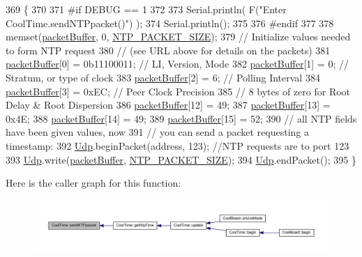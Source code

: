 \begin{DoxyCode}
369 \{
370 
371 \textcolor{preprocessor}{#if DEBUG == 1 }
372 
373     Serial.println( F(\textcolor{stringliteral}{"Enter CoolTime.sendNTPpacket()"}) );
374     Serial.println();
375 
376 \textcolor{preprocessor}{#endif}
377 
378     memset(\hyperlink{class_cool_time_a27e6abc82a5c2f72161956967005bec7}{packetBuffer}, 0, \hyperlink{_cool_time_8h_a56a6ea64006651b4f42adf713e244f06}{NTP\_PACKET\_SIZE});
379     \textcolor{comment}{// Initialize values needed to form NTP request}
380     \textcolor{comment}{// (see URL above for details on the packets)}
381     \hyperlink{class_cool_time_a27e6abc82a5c2f72161956967005bec7}{packetBuffer}[0] = 0b11100011;   \textcolor{comment}{// LI, Version, Mode}
382     \hyperlink{class_cool_time_a27e6abc82a5c2f72161956967005bec7}{packetBuffer}[1] = 0;     \textcolor{comment}{// Stratum, or type of clock}
383     \hyperlink{class_cool_time_a27e6abc82a5c2f72161956967005bec7}{packetBuffer}[2] = 6;     \textcolor{comment}{// Polling Interval}
384     \hyperlink{class_cool_time_a27e6abc82a5c2f72161956967005bec7}{packetBuffer}[3] = 0xEC;  \textcolor{comment}{// Peer Clock Precision}
385     \textcolor{comment}{// 8 bytes of zero for Root Delay & Root Dispersion}
386     \hyperlink{class_cool_time_a27e6abc82a5c2f72161956967005bec7}{packetBuffer}[12]  = 49;
387     \hyperlink{class_cool_time_a27e6abc82a5c2f72161956967005bec7}{packetBuffer}[13]  = 0x4E;
388     \hyperlink{class_cool_time_a27e6abc82a5c2f72161956967005bec7}{packetBuffer}[14]  = 49;
389     \hyperlink{class_cool_time_a27e6abc82a5c2f72161956967005bec7}{packetBuffer}[15]  = 52;
390     \textcolor{comment}{// all NTP fields have been given values, now}
391     \textcolor{comment}{// you can send a packet requesting a timestamp:                 }
392     \hyperlink{class_cool_time_a4e23216a8121ca79d0fb019f30884b92}{Udp}.beginPacket(address, 123); \textcolor{comment}{//NTP requests are to port 123}
393     \hyperlink{class_cool_time_a4e23216a8121ca79d0fb019f30884b92}{Udp}.write(\hyperlink{class_cool_time_a27e6abc82a5c2f72161956967005bec7}{packetBuffer}, \hyperlink{_cool_time_8h_a56a6ea64006651b4f42adf713e244f06}{NTP\_PACKET\_SIZE});
394     \hyperlink{class_cool_time_a4e23216a8121ca79d0fb019f30884b92}{Udp}.endPacket(); 
395 \}
\end{DoxyCode}
Here is the caller graph for this function\+:\nopagebreak
\begin{figure}[H]
\begin{center}
\leavevmode
\includegraphics[width=350pt]{d6/d49/class_cool_time_a236a38d120dc53bc67456d763838c5a1_icgraph}
\end{center}
\end{figure}
\mbox{\label{class_cool_time_ab81ea7fdaace111aa01cc1ec84c6d297}} 
